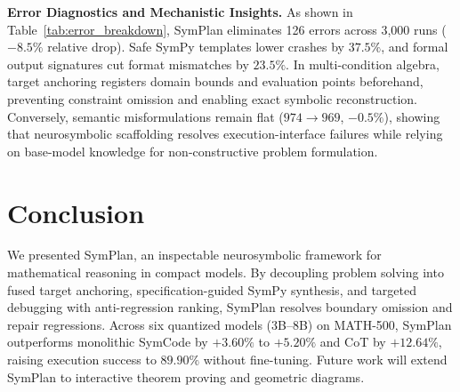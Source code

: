 \documentclass[runningheads]{llncs}
\begin{document}
\textbf{Error Diagnostics and Mechanistic Insights.} As shown in Table~\ref{tab:error_breakdown}, SymPlan eliminates 126 errors across 3,000 runs ($-8.5\%$ relative drop). Safe SymPy templates lower crashes by $37.5\%$, and formal output signatures cut format mismatches by $23.5\%$. In multi-condition algebra, target anchoring registers domain bounds and evaluation points beforehand, preventing constraint omission and enabling exact symbolic reconstruction. Conversely, semantic misformulations remain flat ($974 \to 969$, $-0.5\%$), showing that neurosymbolic scaffolding resolves execution-interface failures while relying on base-model knowledge for non-constructive problem formulation.

\section{Conclusion}

We presented SymPlan, an inspectable neurosymbolic framework for mathematical reasoning in compact models. By decoupling problem solving into fused target anchoring, specification-guided SymPy synthesis, and targeted debugging with anti-regression ranking, SymPlan resolves boundary omission and repair regressions. Across six quantized models (3B--8B) on MATH-500, SymPlan outperforms monolithic SymCode by $+3.60\%$ to $+5.20\%$ and CoT by $+12.64\%$, raising execution success to $89.90\%$ without fine-tuning. Future work will extend SymPlan to interactive theorem proving and geometric diagrams.

\makeatletter
\renewenvironment{thebibliography}[1]
     {\section*{\refname}%
      \def\@biblabel##1{##1.}%
      \footnotesize
      \list{\@biblabel{\@arabic\c@enumiv}}%
           {\settowidth\labelwidth{\@biblabel{#1}}%
            \leftmargin\labelwidth
            \advance\leftmargin\labelsep
            \setlength{\itemsep}{-2.2pt}%
            \setlength{\parsep}{0pt}%
            \usecounter{enumiv}%
            \let\p@enumiv\@empty
            \renewcommand\theenumiv{\@arabic\c@enumiv}}%
      \sloppy\clubpenalty4000\widowpenalty4000%
      \sfcode`\.=\@m}
     {\def\@noitemerr
       {\@latex@warning{Empty `thebibliography' environment}}%
      \endlist}
\makeatother


\end{document}

